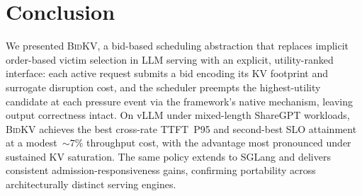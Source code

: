 \documentclass[conference]{IEEEtran}
\newcommand{\bidkv}{\textsc{BidKV}\xspace}
\begin{document}
\section{Conclusion}\label{sec:conclusion}

We presented \bidkv, a bid-based scheduling abstraction that replaces
implicit order-based victim selection in LLM serving with an explicit,
utility-ranked interface: each active request submits a bid encoding its
KV footprint and surrogate disruption cost, and the scheduler preempts the
highest-utility candidate at each pressure event via the framework's native
mechanism, leaving output correctness intact.
On vLLM under mixed-length ShareGPT workloads, \bidkv achieves the best
cross-rate TTFT~P95 and second-best SLO attainment at a modest~${\sim}7\%$
throughput cost, with the advantage most pronounced under sustained KV
saturation.
The same policy extends to SGLang and delivers consistent
admission-responsiveness gains, confirming portability across
architecturally distinct serving engines.




\end{document}
